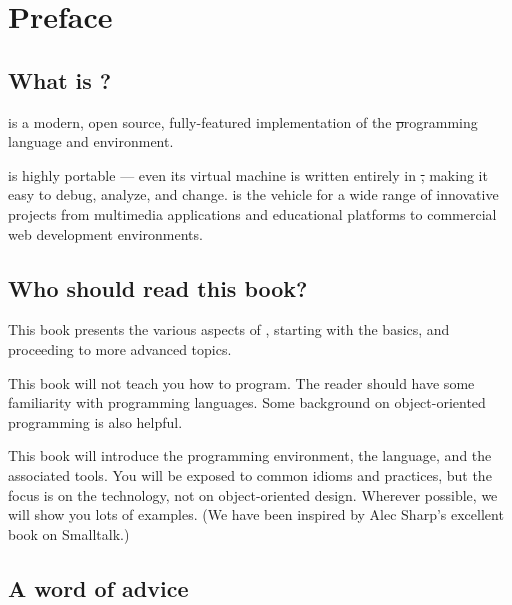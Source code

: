 \documentclass[a4paper,10pt,twoside]{book}
\begin{document}
	\renewcommand{\nnbb}[2]{} %
	\sloppy
	\frontmatter
\fi
\chapter{Preface}\label{cha:intro}

\section*{What is \sq?}

\sq is a modern, open source, fully-featured implementation of the \st programming language and environment.

\sq is highly portable --- even its virtual machine is written entirely in \st, making it easy to debug, analyze, and change. \sq is the vehicle for a wide range of innovative projects from multimedia applications and educational platforms to commercial web development environments. 

\section*{Who should read this book?}

This book presents the various aspects of \sq, starting with the basics, and proceeding to more advanced topics.

This book will not teach you how to program. The reader should have some familiarity with programming languages. Some background on object-oriented programming is also helpful.

This book will introduce the \sq programming environment, the language, and the associated tools.  You will be exposed to common idioms and practices, but the focus is on the technology, not on object-oriented design. Wherever possible, we will show you lots of examples. (We have been inspired by Alec Sharp's excellent book on Smalltalk\cite{Shar97a}.)

\ifluluelse{}{\newpage} %
\section*{A word of advice}

\end{document}
